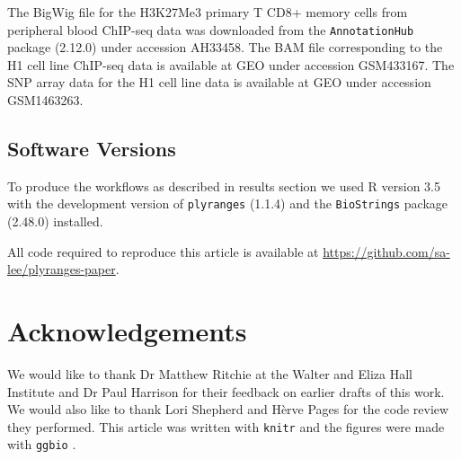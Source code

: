 \documentclass[]{article}
\begin{document}
The BigWig file for the H3K27Me3 primary T CD8+ memory cells from
peripheral blood ChIP-seq data was downloaded from the
\texttt{AnnotationHub} package (2.12.0) under accession AH33458. The BAM
file corresponding to the H1 cell line ChIP-seq data is available at GEO
under accession GSM433167. The SNP array data for the H1 cell line data
is available at GEO under accession GSM1463263.

\hypertarget{software-versions}{%
\subsection{Software Versions}\label{software-versions}}

To produce the workflows as described in results section we used R
version 3.5 with the development version of \texttt{plyranges} (1.1.4)
and the \texttt{BioStrings} package (2.48.0) installed.

All code required to reproduce this article is available at
\url{https://github.com/sa-lee/plyranges-paper}.

\hypertarget{acknowledgements}{%
\section{Acknowledgements}\label{acknowledgements}}

We would like to thank Dr Matthew Ritchie at the Walter and Eliza Hall
Institute and Dr Paul Harrison for their feedback on earlier drafts of
this work. We would also like to thank Lori Shepherd and Hèrve Pages for
the code review they performed. This article was written with
\texttt{knitr} \cite{R-knitr} and the figures were made with
\texttt{ggbio} \cite{R-ggbio}.




\newpage
\singlespacing 
\printbibliography[title=References]
\end{document}
